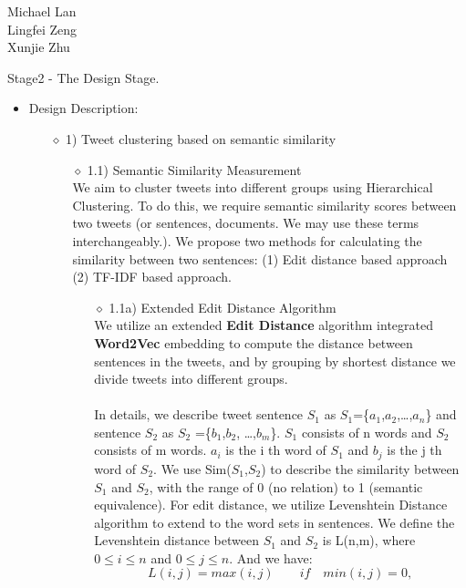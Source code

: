 \documentclass[10pt]{article}
\begin{document}
\begin{raggedright}
Michael Lan \\
Lingfei Zeng \\
Xunjie Zhu \\
\end{raggedright}

\vspace{5mm} 

Stage2 - The Design Stage. 
\begin{itemize} 
\item{ Design Description:\\} 
\begin{itemize}
There are three types of users who will use this system. We will begin with the first user type: 1) users who select a topic and bring up a cluster of tweets related to that topic.

\item[$\diamond$]{1) Tweet clustering based on semantic similarity}
\begin{itemize}
\item[$\diamond$]{1.1) Semantic Similarity Measurement}\\
We aim to cluster tweets into different groups using Hierarchical Clustering. To do this, we require semantic similarity scores between two tweets (or sentences, documents. We may use these terms interchangeably.).
We propose two methods for calculating the similarity between two sentences: (1) Edit distance based approach (2) TF-IDF based approach.


\begin{itemize}
\item[$\diamond$]{1.1a) Extended Edit Distance Algorithm}\\
We utilize an extended {\bf Edit Distance} algorithm integrated {\bf Word2Vec} embedding to compute the distance between sentences in the tweets, and by grouping by shortest distance we divide tweets into different groups. \\\\
In details, we describe tweet sentence $S_1$ as $S_1$=\{$a_1$,$a_2$,…,$a_n$\} and sentence $S_2$ as $S_2$ =\{$b_1$,$b_2$, …,$b_m$\}. $S_1$ consists of n words and $S_2$ consists of m words. $a_i$ is the i th word of $S_1$ and $b_j$ is the j th word of $S_2$. We use Sim($S_1$,$S_2$) to describe the similarity between $S_1$ and $S_2$, with the range of 0 (no relation) to 1 (semantic equivalence). For edit distance, we utilize Levenshtein Distance algorithm to extend to the word sets in sentences. We define the Levenshtein distance between $S_1$ and $S_2$ is L(n,m), where  \(0\leq i\leq n\) and \(0\leq j\leq n\). And we have: \[L(i, j) = max(i, j)  \qquad   if \quad min(i,j)=0, \]  


\end{itemize}
\end{itemize}
\end{itemize}
\end{itemize}
\end{document}
